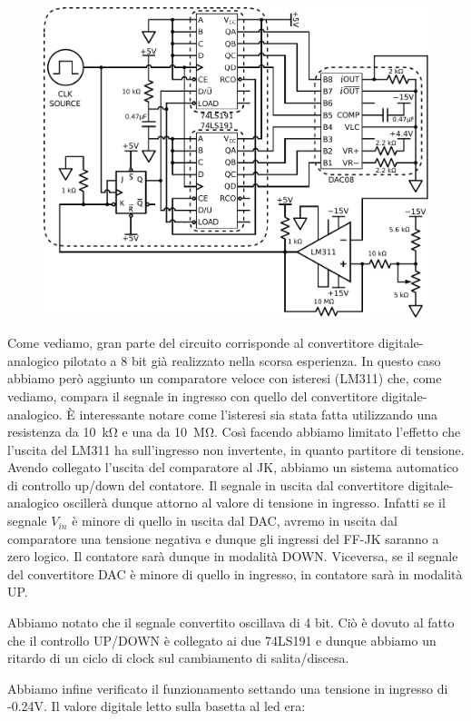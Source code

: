 \begin{figure}[htpc]
\centering
	\includegraphics[width=.73\textwidth]{../E13/latex/ADC.pdf}
	\caption{}
	\label{cir13:ADC}
\end{figure}

Come vediamo, gran parte del circuito corrisponde al convertitore digitale-analogico pilotato a 8 bit già realizzato nella scorsa esperienza. In questo caso abbiamo però aggiunto un comparatore veloce con isteresi (LM311) che, come vediamo, compara il segnale in ingresso con quello del convertitore digitale-analogico. È interessante notare come l'isteresi sia stata fatta utilizzando una resistenza da \SI{10}{\kilo\ohm} e una da \SI{10}{\mega\ohm}. Così facendo abbiamo limitato l'effetto che l'uscita del LM311 ha sull'ingresso non invertente, in quanto partitore di tensione. Avendo collegato l'uscita del comparatore al JK, abbiamo un sistema automatico di controllo up/down del contatore. Il segnale in uscita dal convertitore digitale-analogico oscillerà dunque attorno al valore di tensione in ingresso. Infatti se il segnale $V_{in}$ è minore di quello in uscita dal DAC, avremo in uscita dal comparatore una tensione negativa e dunque gli ingressi del FF-JK saranno a zero logico. Il contatore sarà  dunque in modalità DOWN. Viceversa, se il segnale del convertitore DAC è minore di quello in ingresso, in contatore sarà in modalità UP. 

Abbiamo notato che il segnale convertito oscillava di 4 bit. Ciò è dovuto al fatto che il controllo UP/DOWN è collegato ai due 74LS191 e dunque abbiamo un ritardo di un ciclo di clock sul cambiamento di salita/discesa.

Abbiamo infine verificato il funzionamento settando una tensione in ingresso di -0.24V. Il valore digitale letto sulla basetta al led era:


